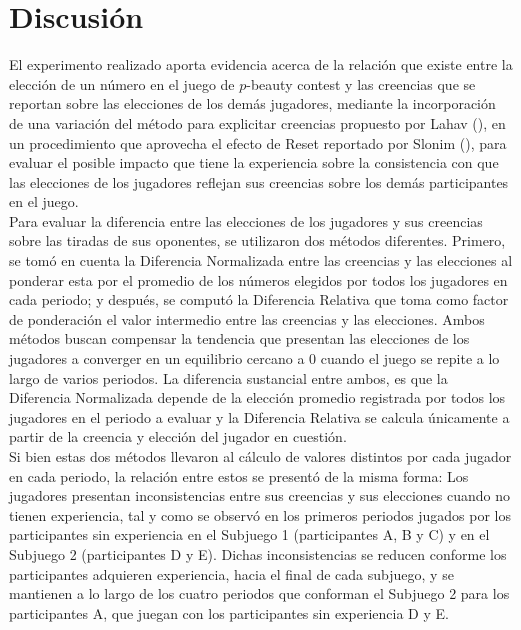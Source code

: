 
\chapter{Discusión} %

\label{Cap_Disc} %

El experimento realizado aporta evidencia acerca de la relación que existe entre la elección de un número en el juego de $p$-beauty contest y las creencias que se reportan sobre las elecciones de los demás jugadores, mediante la incorporación de una variación del método para explicitar creencias propuesto por Lahav (\citeyear{Lahav}), en un procedimiento que aprovecha el efecto de Reset reportado por Slonim (\citeyear{Slonim}), para evaluar el posible impacto que tiene la experiencia sobre la consistencia con que las elecciones de los jugadores reflejan sus creencias sobre los demás participantes en el juego. \\

Para evaluar la diferencia entre las elecciones de los jugadores y sus creencias sobre las tiradas de sus oponentes, se utilizaron dos métodos diferentes. Primero, se tomó en cuenta la Diferencia Normalizada entre las creencias y las elecciones al ponderar esta por el promedio de los números elegidos por todos los jugadores en cada periodo; y después, se computó la Diferencia Relativa que toma como factor de ponderación el valor intermedio entre las creencias y las elecciones. Ambos métodos buscan compensar la tendencia que presentan las elecciones de los jugadores a converger en un equilibrio cercano a 0 cuando el juego se repite a lo largo de varios periodos. La diferencia sustancial entre ambos, es que la Diferencia Normalizada depende de la elección promedio registrada por todos los jugadores en el periodo a evaluar y la Diferencia Relativa se calcula únicamente a partir de la creencia y elección del jugador en cuestión.\\

Si bien estas dos métodos llevaron al cálculo de valores distintos por cada jugador en cada periodo,  la relación entre estos se presentó de la misma forma: Los jugadores presentan inconsistencias entre sus creencias y sus elecciones cuando no tienen experiencia, tal y como se observó en los primeros periodos jugados por los participantes sin experiencia en el Subjuego 1 (participantes A, B y C) y en  el Subjuego 2 (participantes D y E). Dichas inconsistencias se reducen conforme los participantes adquieren experiencia, hacia el final de cada subjuego, y se mantienen a lo largo de los cuatro periodos que conforman el Subjuego 2 para los participantes A, que juegan con los participantes sin experiencia D y E.\\

